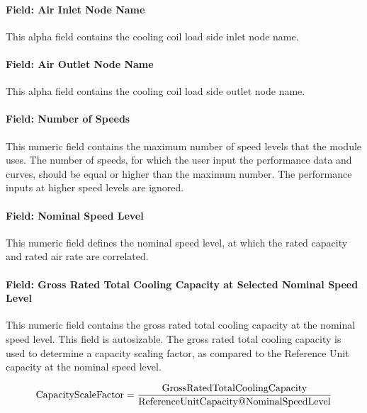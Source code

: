 \paragraph{Field: Air Inlet Node Name}\label{field-air-inlet-node-name-12}

This alpha field contains the cooling coil load side inlet node name.

\paragraph{Field: Air Outlet Node Name}\label{field-air-outlet-node-name-12}

This alpha field contains the cooling coil load side outlet node name.

\paragraph{Field: Number of Speeds}\label{field-number-of-speeds-1}

This numeric field contains the maximum number of speed levels that the module uses. The number of speeds, for which the user input the performance data and curves, should be equal or higher than the maximum number. The performance inputs at higher speed levels are ignored.

\paragraph{Field: Nominal Speed Level}\label{field-nominal-speed-level}

This numeric field defines the nominal speed level, at which the rated capacity and rated air rate are correlated.

\paragraph{Field: Gross Rated Total Cooling Capacity at Selected Nominal Speed Level}\label{field-gross-rated-total-cooling-capacity-at-selected-nominal-speed-level}

This numeric field contains the gross rated total cooling capacity at the nominal speed level. This field is autosizable. The gross rated total cooling capacity is used to determine a capacity scaling factor, as compared to the Reference Unit capacity at the nominal speed level.

\begin{equation}
{\rm{CapacityScaleFactor}} = \frac{{{\rm{Gross RatedTotalCoolingCapacity}}}}{{{\rm{ReferenceUnitCapacity}}@{\rm{NominalSpeedLevel}}}}
\end{equation}

